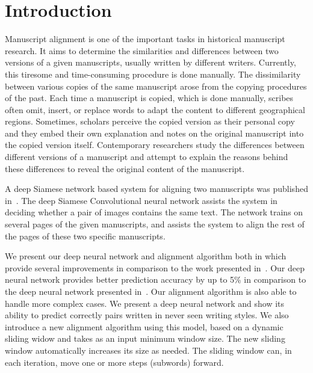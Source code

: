 \documentclass[10pt, a4paper, conference, compsocconf]{IEEEtran}
\begin{document}
%
\IEEEpeerreviewmaketitle


\section{Introduction}
Manuscript alignment is one of the important tasks in historical manuscript research. It aims to determine the similarities and differences between two versions of a given manuscripts, usually written by different writers. Currently, this tiresome and time-consuming procedure is done manually. The dissimilarity between various copies of the same manuscript arose from the copying procedures of the past. Each time a manuscript is copied, which is done manually, scribes often omit, insert, or replace words to adapt the content to different geographical regions. Sometimes, scholars perceive the copied version as their personal copy and they embed their own explanation and notes on the original manuscript into the copied version itself. Contemporary researchers study the differences between different versions of a manuscript and attempt to explain the reasons behind these differences to reveal the original content of the manuscript.

A deep Siamese network based system for aligning two manuscripts was published in~\cite{kassis2017siamese}. The deep Siamese Convolutional neural network assists the system in deciding whether a pair of images contains the same text. The network trains on several pages of the given manuscripts, and assists the system to align the rest of the pages of these two specific manuscripts.

We present our deep neural network and alignment algorithm both in which provide several improvements in comparison to the work presented in~\cite{kassis2017siamese}. Our deep neural network provides better prediction accuracy by up to 5\% in comparison to the deep neural network presented in~\cite{kassis2017siamese}. Our alignment algorithm is also able to handle more complex cases. We present a deep neural network and show its ability to predict correctly pairs written in never seen writing styles. We also introduce a new alignment algorithm using this model, based on a dynamic sliding widow and takes as an input minimum window size. The new sliding window automatically increases its size as needed. The sliding window can, in each iteration, move one or more steps (subwords) forward.
\end{document}
